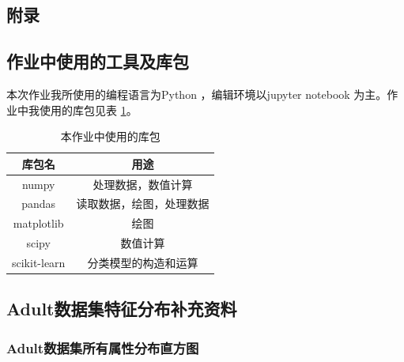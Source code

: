 \documentclass[12pt,a4paper]{article}
\theoremstyle{definition}
\begin{document}
\newpage
\begin{appendix}
	\section{附录}
	\subsection{作业中使用的工具及库包}
	\label{apd:tools}
	本次作业我所使用的编程语言为Python \cite{python}，编辑环境以jupyter notebook \cite{notebook} 为主。作业中我使用的库包见表 \ref{tab:import}。
	
	\begin{table}[H]
		\renewcommand\arraystretch{1.35}
		\caption{本作业中使用的库包}
		\label{tab:import}
		\centering
		
		\begin{tabular}{c|c}
			\centering
			库包名 &  用途 \\
			\hline
	
			numpy \cite{numpy} & 处理数据，数值计算 \\
			pandas \cite{pandas} & 读取数据，绘图，处理数据 \\
			matplotlib \cite{matplotlib} & 绘图 \\
			scipy \cite{scipy} & 数值计算 \\
			scikit-learn \cite{sklearn} & 分类模型的构造和运算 \\
	
		\end{tabular}
	\end{table}
	
	\subsection{Adult数据集特征分布补充资料}
	\label{apd:dis_detail}
	
	\subsubsection{Adult数据集所有属性分布直方图}
	\label{apd:attri}
	

\end{appendix}
\end{document}
